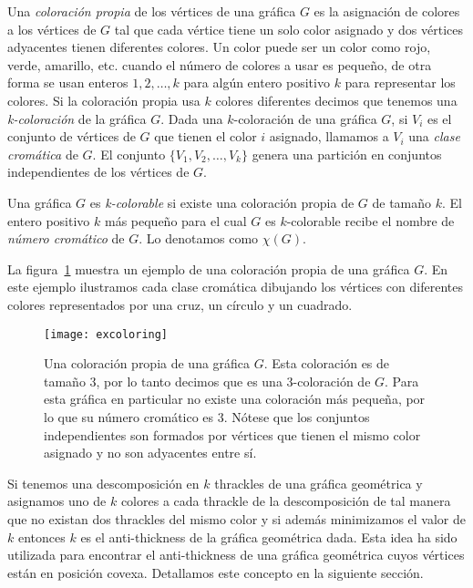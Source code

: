 Una \emph{coloración propia} de los vértices de una gráfica $G$ es la asignación
de colores a los vértices de $G$ tal que cada vértice tiene un solo color
asignado y dos vértices adyacentes tienen diferentes colores.
Un color puede ser un color como rojo, verde, amarillo, etc. cuando el número
de colores a usar es pequeño, de otra forma se usan enteros $1,2,\dots,k$
para algún entero positivo $k$ para representar los colores. Si la coloración
propia usa $k$ colores diferentes decimos que tenemos una \emph{k-coloración}
de la gráfica $G$. Dada una $k$-coloración de una gráfica $G$, si $V_i$ es el
conjunto de vértices de $G$ que tienen el color $i$ asignado, llamamos a $V_i$
una \emph{clase cromática} de $G$. El conjunto $\{V_1,V_2,\dots,V_k\}$ genera
una partición en conjuntos independientes de los vértices de $G$.

Una gráfica $G$ es \emph{k-colorable} si existe una coloración propia de $G$ de
tamaño $k$. El entero positivo $k$ más pequeño para el cual $G$ es
$k$-colorable recibe el nombre de \emph{número cromático} de $G$. Lo denotamos
como $\chi(G)$.


La figura~\ref{fig:excoloring} muestra un ejemplo de una coloración propia de
una gráfica $G$. En este ejemplo ilustramos cada clase cromática dibujando los
vértices con diferentes colores representados por una cruz, un círculo y un
cuadrado.
\begin{figure}[htpb]
  \centering
  \texttt{[image: excoloring]}
  \caption{Una coloración propia de una gráfica $G$. Esta coloración es de
  tamaño 3, por lo tanto decimos que es una 3-coloración de $G$. Para esta
  gráfica en particular no existe una coloración más pequeña, por lo que su
  número cromático es 3. Nótese que los conjuntos independientes son formados
  por vértices que tienen el mismo color asignado y no son adyacentes entre sí.}
  \label{fig:excoloring}
\end{figure}
Si tenemos una descomposición en $k$ thrackles de una gráfica geométrica y
asignamos uno de $k$ colores a cada thrackle de la descomposición de tal
manera que no existan dos thrackles del mismo color y si además minimizamos
el valor de $k$ entonces $k$ es el anti-thickness de la gráfica geométrica dada.
Esta idea ha sido utilizada para encontrar el anti-thickness de una gráfica
geométrica cuyos vértices están en posición covexa. Detallamos este concepto en
la siguiente sección.

